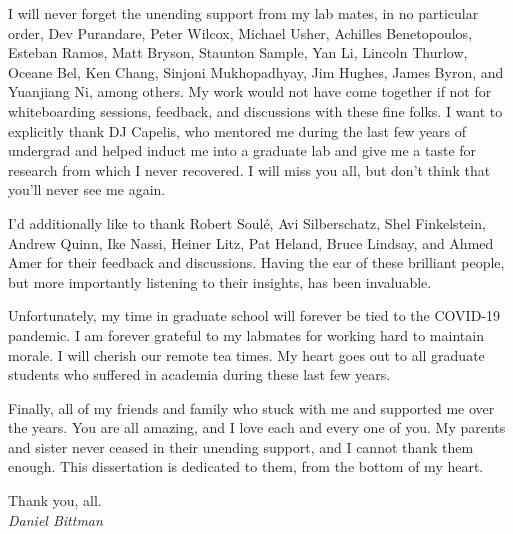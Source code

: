 I will never forget the unending support from my lab mates, in no particular order, Dev Purandare, Peter Wilcox, Michael Usher,
Achilles Benetopoulos, Esteban Ramos, Matt Bryson, Staunton Sample, Yan Li, Lincoln Thurlow, Oceane Bel, Ken Chang,
Sinjoni Mukhopadhyay, Jim Hughes, James Byron, and Yuanjiang Ni, among others. My work would not have come together if not for whiteboarding
sessions, feedback, and discussions with these fine folks. I want to explicitly thank DJ Capelis, who mentored me during
the last few years of undergrad and helped induct me into a graduate lab and give me a taste for research from which I
never recovered. I will miss you all, but don't think that you'll never see me again.

I'd additionally like to thank Robert Soulé, Avi Silberschatz, Shel Finkelstein, Andrew Quinn, Ike Nassi, Heiner Litz,
Pat Heland, Bruce Lindsay, and Ahmed Amer for their feedback and discussions. Having the ear of these brilliant people,
but more importantly listening to their insights, has been invaluable.



Unfortunately, my time in graduate school will forever be tied to the COVID-19 pandemic. I am forever grateful to my
labmates for working hard to maintain morale. I will cherish our remote tea times. My heart goes out to all graduate
students who suffered in academia during these last few years.

Finally, all of my friends and family who stuck with me and supported me over the years. You are all amazing, and I love each and
every one of you. My parents and sister never ceased in their unending support, and I cannot thank them enough. This
dissertation is dedicated to them, from the bottom of my heart.

Thank you, all. \heart \\

{
\hfill
\emph{
    Daniel Bittman
}
}

\endgroup
